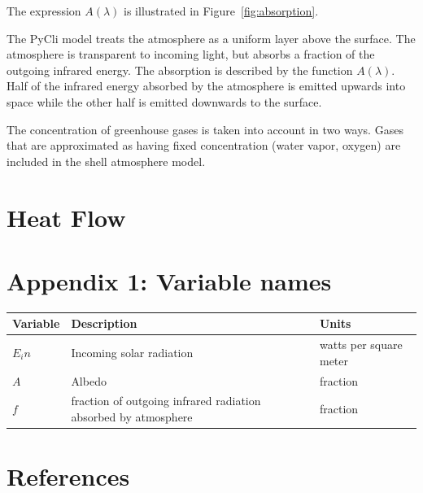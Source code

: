 \documentclass[12pt]{article} %
\begin{document}
The expression $A(\lambda)$ is illustrated in Figure~\ref{fig:absorption}.

The PyCli model treats the atmosphere as a uniform layer above the surface. The atmosphere is transparent to incoming light, but absorbs a fraction of the outgoing infrared energy. The absorption is described by the function $A(\lambda)$. Half of the infrared energy absorbed by the atmosphere is emitted upwards into space while the other half is emitted downwards to the surface.

The concentration of greenhouse gases is taken into account in two ways. Gases that are approximated as having fixed concentration (water vapor, oxygen) are included in the shell atmosphere model. 
\newpage
\section{Heat Flow}
\label{sec:heatflow}

\newpage
\section{Appendix 1: Variable names}

\begin{center}
\begin{tabular}{|m{2 cm}| m{6 cm}| m{6 cm}|} \hline
\textbf{Variable} & \textbf{Description} & \textbf{Units}\\ \hline
$E_in$ & Incoming solar radiation & watts per square meter\\ \hline
$A$ & Albedo & fraction\\ \hline
$f$  & fraction of outgoing infrared radiation absorbed by atmosphere & fraction \\ \hline
\end{tabular}
\end{center}


\newpage
\section{References}
\label{sec:references}
\end{document}
